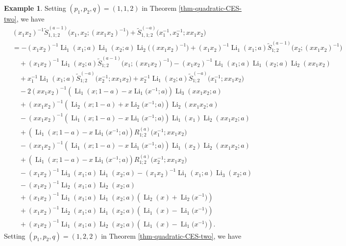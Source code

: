 \documentclass[11pt]{article}
\DeclareMathOperator{\Li}{Li}
\theoremstyle{plain}
\theoremstyle{definition}
\newtheorem{exa}[thm]{Example}
\begin{document}
\begin{exa}Setting $(p_1,p_2,q)=(1,1,2)$ in Theorem \ref{thm-quadratic-CES-two}, we have
\begin{align*}
	&(x_1x_2)^{-1}\tilde{S}^{(a-1)}_{1,1;2}\Big(x_1,x_2;(xx_1x_2)^{-1}\Big)+\tilde{S}^{(-a)}_{1,1;2}\Big(x_1^{-1},x_2^{-1};xx_1x_2\Big)\\
	&=-(x_1x_2)^{-1}\Li_{1}(x_1;a)\Li_{1}(x_2;a)\Li_2\Big((xx_1x_2)^{-1}\Big)+(x_1x_2)^{-1}\Li_{1}(x_1;a)\tilde{S}^{(a-1)}_{1;2}\Big(x_2;(xx_1x_2)^{-1}\Big)\nonumber\\
	&\quad+(x_1x_2)^{-1}\Li_{1}(x_2;a)\tilde{S}^{(a-1)}_{1;2}\Big(x_1;(xx_1x_2)^{-1}\Big)-(x_1x_2)^{-1}\Li_{1}(x_1;a)\Li_{1}(x_2;a)\Li_2(xx_1x_2)\\
	&\quad+x_1^{-1}\Li_{1}(x_1;a)\tilde{S}^{(-a)}_{1;2}\Big(x_2^{-1};xx_1x_2\Big)+x_2^{-1}\Li_{1}(x_2;a)\tilde{S}^{(-a)}_{1;2}\Big(x_1^{-1};xx_1x_2\Big)\\
	&\quad-2(xx_1x_2)^{-1}\left(\Li_{1}(x;1-a)-x \Li_{1}\Big(x^{-1};a\Big)\right)\Li_{3}(xx_1x_2;a)\nonumber\\
	&\quad+(xx_1x_2)^{-1}\left(\Li_{2}(x;1-a)+x \Li_{2}\Big(x^{-1};a\Big)\right)\Li_{2}(xx_1x_2;a)\\
	&\quad-(xx_1x_2)^{-1}\left(\Li_{1}(x;1-a)-x \Li_{1}\Big(x^{-1};a\Big)\right)\Li_{1}(x_1)\Li_{2}(xx_1x_2;a)\nonumber\\
	&\quad+\left(\Li_{1}(x;1-a)-x\Li_{1}\Big(x^{-1};a\Big)\right)R^{(a)}_{1;2}\Big(x_1^{-1};xx_1x_2\Big)\nonumber\\
	&\quad-(xx_1x_2)^{-1}\left(\Li_{1}(x;1-a)-x \Li_{1}\Big(x^{-1};a\Big)\right)\Li_{1}(x_2)\Li_{2}(xx_1x_2;a)\nonumber\\
	&\quad+\left(\Li_{1}(x;1-a)-x\Li_{1}\Big(x^{-1};a\Big)\right)R^{(a)}_{1;2}\Big(x_2^{-1};xx_1x_2\Big)\nonumber\\
	&\quad-(x_1x_2)^{-1}\Li_{3}(x_1;a)\Li_{1}(x_2;a)-(x_1x_2)^{-1}\Li_{1}(x_1;a)\Li_{3}(x_2;a)\\
	&\quad-(x_1x_2)^{-1}\Li_{2}(x_1;a)\Li_{2}(x_2;a)\\
	&\quad+(x_1x_2)^{-1}\Li_{1}(x_1;a)\Li_{1}(x_2;a)\left(\Li_{2}(x)+ \Li_{2}\Big(x^{-1}\Big)\right)\\
	&\quad+(x_1x_2)^{-1}\Li_{2}(x_1;a)\Li_{1}(x_2;a)\left(\Li_{1}(x)-\Li_{1}\Big(x^{-1}\Big)\right)\\
	&\quad+(x_1x_2)^{-1}\Li_{1}(x_1;a)\Li_{2}(x_2;a)\left(\Li_{1}(x)-\Li_{1}\Big(x^{-1}\Big)\right).
\end{align*}
Setting $(p_1,p_2,q)=(1,2,2)$ in Theorem \ref{thm-quadratic-CES-two}, we have
\begin{align*}

\end{align*}
\end{exa}
\end{document}
